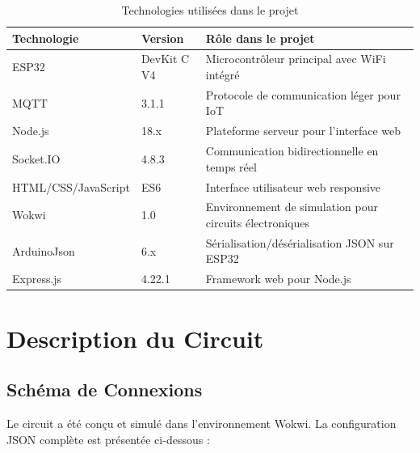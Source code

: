 \documentclass[12pt,a4paper]{article}
\begin{document}
\begin{table}[h]
    \centering
    \begin{tabular}{|l|l|p{8cm}|}
        \hline
        \textbf{Technologie} & \textbf{Version} & \textbf{Rôle dans le projet} \\
        \hline
        ESP32 & DevKit C V4 & Microcontrôleur principal avec WiFi intégré \\
        \hline
        MQTT & 3.1.1 & Protocole de communication léger pour IoT \\
        \hline
        Node.js & 18.x & Plateforme serveur pour l'interface web \\
        \hline
        Socket.IO & 4.8.3 & Communication bidirectionnelle en temps réel \\
        \hline
        HTML/CSS/JavaScript & ES6 & Interface utilisateur web responsive \\
        \hline
        Wokwi & 1.0 & Environnement de simulation pour circuits électroniques \\
        \hline
        ArduinoJson & 6.x & Sérialisation/désérialisation JSON sur ESP32 \\
        \hline
        Express.js & 4.22.1 & Framework web pour Node.js \\
        \hline
    \end{tabular}
    \caption{Technologies utilisées dans le projet}
    \label{tab:technologies}
\end{table}

\newpage

\section{Description du Circuit}

\subsection{Schéma de Connexions}
Le circuit a été conçu et simulé dans l'environnement Wokwi. La configuration JSON complète est présentée ci-dessous :
\end{document}
